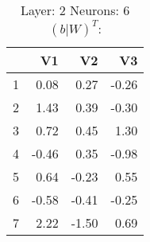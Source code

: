 \begin{table}[ht]
\centering
\begin{tabular}{rrrr}
  \hline
 & V1 & V2 & V3 \\ 
  \hline
1 & 0.08 & 0.27 & -0.26 \\ 
  2 & 1.43 & 0.39 & -0.30 \\ 
  3 & 0.72 & 0.45 & 1.30 \\ 
  4 & -0.46 & 0.35 & -0.98 \\ 
  5 & 0.64 & -0.23 & 0.55 \\ 
  6 & -0.58 & -0.41 & -0.25 \\ 
  7 & 2.22 & -1.50 & 0.69 \\ 
   \hline
\end{tabular}
\caption{Layer: 2 Neurons: 6  $(b|W)^T$: 
} 
\end{table}
